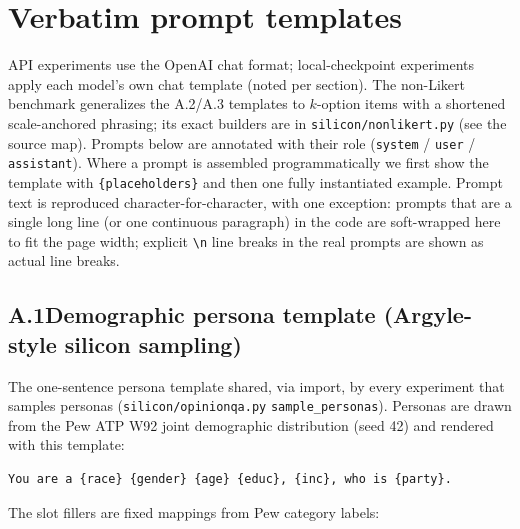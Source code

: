 
\section*{Verbatim prompt templates}

API experiments use the OpenAI chat format; local-checkpoint experiments apply each model's own chat template (noted per section). The non-Likert benchmark generalizes the A.2/A.3 templates to $k$-option items with a shortened scale-anchored phrasing; its exact builders are in \texttt{silicon/nonlikert.py} (see the source map). Prompts below are annotated
with their role (\texttt{system} / \texttt{user} / \texttt{assistant}).
Where a prompt is assembled programmatically we first show the template
with \texttt{\{placeholders\}} and then one fully instantiated example.
Prompt text is reproduced character-for-character, with one exception:
prompts that are a single long line (or one continuous paragraph) in
the code are soft-wrapped here to fit the page width; explicit
\verb|\n| line breaks in the real prompts are shown as actual line
breaks.

\subsection*{A.1\quad Demographic persona template (Argyle-style silicon sampling)}

The one-sentence persona template shared, via import, by every
experiment that samples personas (\texttt{silicon/opinionqa.py}
\texttt{sample\_personas}). Personas are drawn from the Pew ATP W92 joint
demographic distribution (seed 42) and rendered with this template:

\begin{verbatim}
You are a {race} {gender} {age} {educ}, {inc}, who is {party}.
\end{verbatim}

The slot fillers are fixed mappings from Pew category labels:

